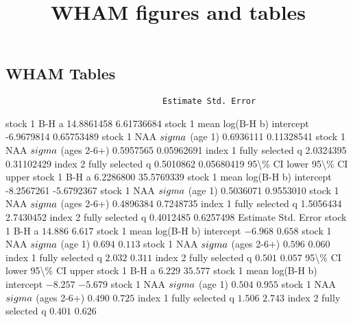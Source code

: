 \documentclass[
]{article}
\title{WHAM figures and tables}
\author{}
\date{\vspace{-2.5em}}
\begin{document}
\maketitle

\subsection{WHAM Tables}\label{wham-tables}

\begin{verbatim}
                                Estimate Std. Error
\end{verbatim}

stock 1 B-H a 14.8861458 6.61736684 stock 1 mean log(B-H b) intercept
-6.9679814 0.65753489 stock 1 NAA \(\\sigma\) (age 1) 0.6936111
0.11328541 stock 1 NAA \(\\sigma\) (ages 2-6+) 0.5957565 0.05962691
index 1 fully selected q 2.0324395 0.31102429 index 2 fully selected q
0.5010862 0.05680419 95\textbackslash\% CI lower 95\textbackslash\% CI
upper stock 1 B-H a 6.2286800 35.5769339 stock 1 mean log(B-H b)
intercept -8.2567261 -5.6792367 stock 1 NAA \(\\sigma\) (age 1)
0.5036071 0.9553010 stock 1 NAA \(\\sigma\) (ages 2-6+) 0.4896384
0.7248735 index 1 fully selected q 1.5056434 2.7430452 index 2 fully
selected q 0.4012485 0.6257498 Estimate Std. Error stock 1 B-H a
\(14.886\) \(6.617\) stock 1 mean log(B-H b) intercept \(-6.968\)
\(0.658\) stock 1 NAA \(\\sigma\) (age 1) \(0.694\) \(0.113\) stock 1
NAA \(\\sigma\) (ages 2-6+) \(0.596\) \(0.060\) index 1 fully selected q
\(2.032\) \(0.311\) index 2 fully selected q \(0.501\) \(0.057\)
95\textbackslash\% CI lower 95\textbackslash\% CI upper stock 1 B-H a
\(6.229\) \(35.577\) stock 1 mean log(B-H b) intercept \(-8.257\)
\(-5.679\) stock 1 NAA \(\\sigma\) (age 1) \(0.504\) \(0.955\) stock 1
NAA \(\\sigma\) (ages 2-6+) \(0.490\) \(0.725\) index 1 fully selected q
\(1.506\) \(2.743\) index 2 fully selected q \(0.401\) \(0.626\)
\end{document}
